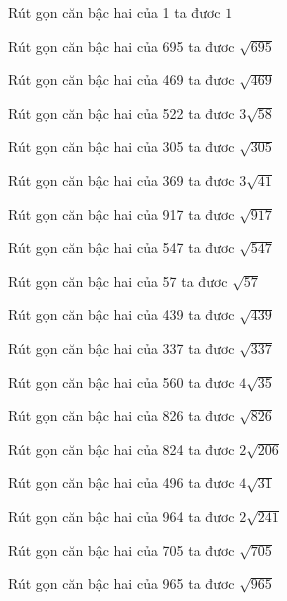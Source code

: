 \documentclass[12pt,a4paper]{article}
\begin{document}
\begin{ex}
Rút gọn căn bậc hai của 1 ta đươc $1$
\end{ex}
\begin{ex}
Rút gọn căn bậc hai của 695 ta đươc $\sqrt{695}$
\end{ex}
\begin{ex}
Rút gọn căn bậc hai của 469 ta đươc $\sqrt{469}$
\end{ex}
\begin{ex}
Rút gọn căn bậc hai của 522 ta đươc $3\sqrt{58}$
\end{ex}
\begin{ex}
Rút gọn căn bậc hai của 305 ta đươc $\sqrt{305}$
\end{ex}
\begin{ex}
Rút gọn căn bậc hai của 369 ta đươc $3\sqrt{41}$
\end{ex}
\begin{ex}
Rút gọn căn bậc hai của 917 ta đươc $\sqrt{917}$
\end{ex}
\begin{ex}
Rút gọn căn bậc hai của 547 ta đươc $\sqrt{547}$
\end{ex}
\begin{ex}
Rút gọn căn bậc hai của 57 ta đươc $\sqrt{57}$
\end{ex}
\begin{ex}
Rút gọn căn bậc hai của 439 ta đươc $\sqrt{439}$
\end{ex}
\begin{ex}
Rút gọn căn bậc hai của 337 ta đươc $\sqrt{337}$
\end{ex}
\begin{ex}
Rút gọn căn bậc hai của 560 ta đươc $4\sqrt{35}$
\end{ex}
\begin{ex}
Rút gọn căn bậc hai của 826 ta đươc $\sqrt{826}$
\end{ex}
\begin{ex}
Rút gọn căn bậc hai của 824 ta đươc $2\sqrt{206}$
\end{ex}
\begin{ex}
Rút gọn căn bậc hai của 496 ta đươc $4\sqrt{31}$
\end{ex}
\begin{ex}
Rút gọn căn bậc hai của 964 ta đươc $2\sqrt{241}$
\end{ex}
\begin{ex}
Rút gọn căn bậc hai của 705 ta đươc $\sqrt{705}$
\end{ex}
\begin{ex}
Rút gọn căn bậc hai của 965 ta đươc $\sqrt{965}$
\end{ex}
\end{document}
